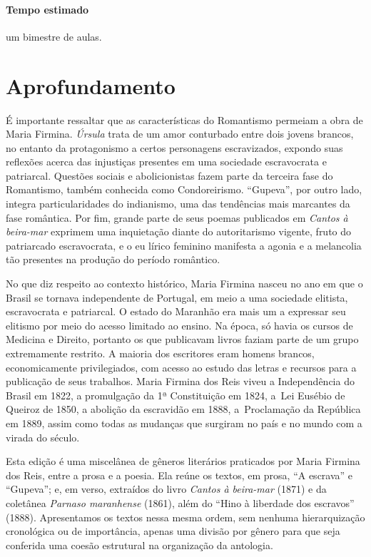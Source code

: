 \documentclass[12pt]{extarticle}
\begin{document}
\paragraph{Tempo estimado} um bimestre de aulas.

\section{Aprofundamento}

É importante ressaltar que as características do Romantismo permeiam a
obra de Maria Firmina. \emph{Úrsula} trata de um amor conturbado entre
dois jovens brancos, no entanto da protagonismo a certos personagens
escravizados, expondo suas reflexões acerca das injustiças presentes em
uma sociedade escravocrata e patriarcal. Questões sociais e
abolicionistas fazem parte da terceira fase do Romantismo, também
conhecida como Condoreirismo. ``Gupeva'', por outro lado, integra
particularidades do indianismo, uma das tendências mais marcantes da
fase romântica. Por fim, grande parte de seus poemas publicados em
\emph{Cantos à beira-mar} exprimem uma inquietação diante do
autoritarismo vigente, fruto do patriarcado escravocrata, e o eu lírico
feminino manifesta a agonia e a melancolia tão presentes na produção do
período romântico.




No que diz respeito ao contexto histórico, Maria Firmina nasceu no ano
em que o Brasil se tornava independente de Portugal, em meio a uma
sociedade elitista, escravocrata e patriarcal. O estado do Maranhão era
mais um a expressar seu elitismo por meio do acesso limitado ao ensino.
Na época, só havia os cursos de Medicina e Direito, portanto os que
publicavam livros faziam parte de um grupo extremamente restrito. A
maioria dos escritores eram homens brancos, economicamente
privilegiados, com acesso ao estudo das letras e recursos para a
publicação de seus trabalhos. Maria Firmina dos Reis viveu a
Independência do Brasil em 1822, a promulgação da 1ª Constituição em
1824, a~Lei Eusébio de Queiroz de 1850, a abolição da escravidão em
1888, a~Proclamação da República em 1889, assim como todas as mudanças
que surgiram no país e no mundo com a virada do século.

Esta edição é uma miscelânea de gêneros literários praticados por Maria
Firmina dos Reis, entre a prosa e a poesia. Ela reúne os textos, em
prosa, ``A escrava'' e ``Gupeva''; e, em verso, extraídos do livro
\emph{Cantos à beira-mar} (1871) e da coletânea \emph{Parnaso
maranhense} (1861), além do ``Hino à liberdade dos escravos'' (1888).
Apresentamos os textos nessa mesma ordem, sem nenhuma hierarquização
cronológica ou de importância, apenas uma divisão por gênero para que
seja conferida uma coesão estrutural na organização da antologia.
\end{document}
